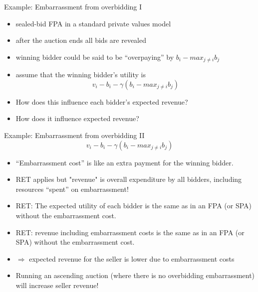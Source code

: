 \documentclass[bigger]{beamer}
\newcommand{\Ra}{\Rightarrow} \newcommand{\ra}{\rightarrow} \newcommand{\Lra}{\Leftrightarrow}
\begin{document}
\begin{frame}[label={sec:org3ead307}]{Example: Embarrassment from overbidding I}
\begin{itemize}
\item sealed-bid FPA in a standard private values model
\item after the auction ends all bids are revealed
\item winning bidder could be said to be “overpaying” by \(b_i -max_{j\neq i} b_ j\)
\item assume that the winning bidder’s utility is
$$v_i - b_i -\gamma (b_ i - max_{j\neq i} b_ j)$$
\item How does this inﬂuence each bidder’s expected revenue?
\item How does it inﬂuence expected revenue?
\end{itemize}
\end{frame}
\begin{frame}[label={sec:org1a0747a}]{Example: Embarrassment from overbidding II}
$$v_i - b_i -\gamma (b_ i - max_{j\neq i} b_ j)$$
\begin{itemize}
\item “Embarrassment cost” is like an extra payment for the winning bidder.
\item RET applies but "revenue" is overall expenditure by all bidders, including resources “spent” on embarrassment!
\item RET: The expected utility of each bidder is the same as in an FPA (or SPA) without the embarrassment cost.
\item RET: revenue including embarrassment costs is the same as in an FPA (or SPA) without the embarrassment cost.
\item \(\Ra\) expected revenue for the seller is lower due to embarrassment costs
\item Running an ascending auction (where there is no overbidding embarrassment) will increase seller revenue!
\end{itemize}
\end{frame}
\end{document}

